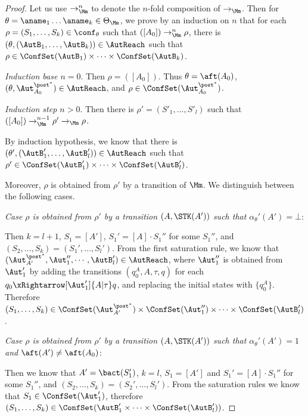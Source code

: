 \begin{proof}
Let us use $\rightarrow_{\Mm}^n$ to denote the $n$-fold composition of $\rightarrow_\Mm$. Then for $\theta = \aname_1 \dots \aname_k \in \Theta_\Mm$, we prove by an induction on $n$ that for each $\rho = (S_1, \dots, S_k) \in \conf_\theta$ such that  $([A_0]) \rightarrow^n_\Mm \rho$, there is  $(\theta, (\AutB_1, \dots, \AutB_k)) \in \AutReach$ such that $\rho \in  \ConfSet(\AutB_1) \times \dots \times \ConfSet(\AutB_k)$.

\noindent \emph{Induction base $n = 0$}. Then $\rho = ([A_0])$. Thus $\theta = \aft(A_0)$, $(\theta, \Aut_{A_0}^{\post^*}) \in \AutReach$, and $\rho \in \ConfSet(\Aut_{A_0}^{\post^*})$.

\smallskip

\noindent \emph{Induction step $n > 0$}. Then there is $\rho' = (S'_1, \dots, S'_l)$ such that $([A_0]) \rightarrow^{n-1}_\Mm \rho' \rightarrow_\Mm \rho$.

By induction hypothesis, we know that there is $(\theta', (\AutB'_1, \dots, \AutB'_l)) \in \AutReach$ such that $ \rho' \in \ConfSet(\AutB'_1) \times \dots \times \ConfSet(\AutB'_l)$.

Moreover, $\rho$ is obtained from $\rho'$  by a transition of $\Mm$. We distinguish between the following cases.

\smallskip
\noindent \emph{Case $\rho$ is obtained from $\rho'$ by a transition $(A,\STK(A'))$ such that $\alpha_\theta'(A')=\bot$}: 

Then $k=l+1$, $S_1=[A']$, $S_1'=[A]\cdot S_1''$ for some $S_1''$, and $(S_2,\dots,S_k)=(S_1',\dots,S_l')$.
From the first saturation rule, we know that $(\Aut_{A'}^{\post^*},\Aut_1'',\cdots,\AutB_l')\in\AutReach$, where $\Aut_1''$ is obtained from $\Aut_1'$ by adding the transitions $(q_0^{A},A,\tau,q)$ for each $q_0\xRightarrow[\Aut_1']{A | \tau} q$, and replacing the initial states with $\{q_0^{A}\}$.
Therefore $(S_1,\dots,S_k)\in\ConfSet(\Aut_{A'}^{\post^*})\times\ConfSet(\Aut_1'')\times\cdots\times\ConfSet(\AutB_l')$.

\noindent \emph{Case $\rho$ is obtained from $\rho'$ by a transition $(A,\STK(A'))$ such that $\alpha_\theta'(A')=1$ and $\aft(A')\neq\aft(A_0)$}: 

Then we know that $A'= \bact(S_1')$, $k = l$, $S_1=[A']$ and $S_1'=[A]\cdot S_1''$ for some $S_1''$, and $(S_2,\dots,S_k)=(S_2',\dots,S_l')$.
From the saturation rules we know that $S_1\in\ConfSet(\Aut_{1}')$, therefore $(S_1,\dots,S_k)\in\ConfSet(\AutB_{1}'\times\cdots\times\ConfSet(\AutB_l'))$.


\end{proof}
